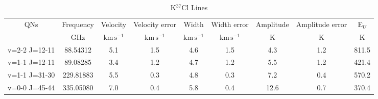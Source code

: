 \begin{table*}[htp]
\centering
\caption{K$^{37}$Cl Lines}
\begin{tabular}{ccccccccc}
\label{tab:K37Cl_salt_lines}
QNs & Frequency & Velocity & Velocity error & Width & Width error & Amplitude & Amplitude error & E$_U$ \\
 & $\mathrm{GHz}$ & $\mathrm{km\,s^{-1}}$ & $\mathrm{km\,s^{-1}}$ & $\mathrm{km\,s^{-1}}$ & $\mathrm{km\,s^{-1}}$ & $\mathrm{K}$ & $\mathrm{K}$ & $\mathrm{K}$ \\
\hline
v=2-2 J=12-11 & 88.54312 & 5.1 & 1.5 & 4.6 & 1.5 & 4.3 & 1.2 & 811.5 \\
v=1-1 J=12-11 & 89.08285 & 3.4 & 1.2 & 4.7 & 1.2 & 5.5 & 1.2 & 421.4 \\
v=1-1 J=31-30 & 229.81883 & 5.5 & 0.3 & 4.8 & 0.3 & 7.2 & 0.4 & 570.2 \\
v=0-0 J=45-44 & 335.05080 & 7.0 & 0.4 & 5.8 & 0.4 & 12.6 & 0.7 & 370.4 \\
\hline
\end{tabular}

\par 
\end{table*}
